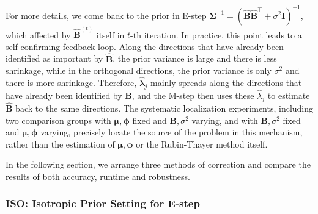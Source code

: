 For more details, we come back to the prior in E-step $\bm{\Sigma}^{-1}=\left(\hat{\mathbf{B}}\hat{\mathbf{B}}^{\top}+\sigma^{2}\mathbf{I}\right)^{-1}$, which affected by $\hat{\mathbf{B}}^{(t)}$ itself in $t$-th iteration. In practice, this point leads to a self-confirming feedback loop. Along the directions that have already been identified as important by $\hat{\mathbf{B}}$, the prior variance is large and there is less shrinkage, while in the orthogonal directions, the prior variance is only $\sigma^{2}$ and there is more shrinkage. Therefore, $\hat{\bm{\lambda}}_{j}$ mainly spreads along the directions that have already been identified by $\hat{\mathbf{B}}$, and the M-step then uses these $\hat{\lambda}_j$ to estimate $\hat{\mathbf{B}}$ back to the same directions. The systematic localization experiments, including two comparison groups with $\bm{\mu},\bm{\phi}$ fixed and $\mathbf{B},\sigma^2$ varying, and with $\mathbf{B},\sigma^2$ fixed and $\bm{\mu},\bm{\phi}$ varying, precisely locate the source of the problem in this mechanism, rather than the estimation of $\bm{\mu},\bm{\phi}$ or the Rubin-Thayer method itself.

In the following section, we arrange three methods of correction and compare the results of both accuracy, runtime and robustness.


\subsubsection{ISO: Isotropic Prior Setting for E-step}
\label{subsubsec:isotropic-prior}

